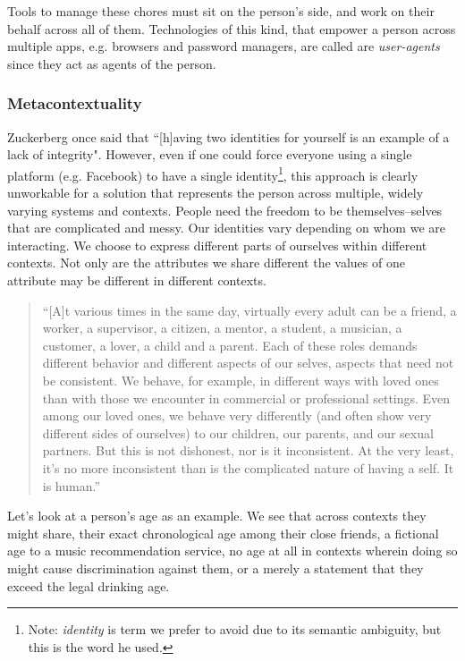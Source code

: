 \documentclass[11pt, oneside]{article}   	%
\begin{document}
Tools to manage these chores must sit on the person's side, and work on their behalf across all of them. Technologies of this kind, that empower a person across multiple apps, e.g. browsers and password managers, are called are \emph{user-agents} since they act as agents of the person. 

\subsubsection{Metacontextuality}

Zuckerberg once said that ``[h]aving two identities for yourself is an example of a lack of integrity"\cite{Kirkpatrick2011}. However, even if one could force everyone using a single platform (e.g. Facebook) to have a single identity\footnote{Note: \emph{identity} is term we prefer to avoid due to its semantic ambiguity, but this is the word he used.}, this approach is clearly unworkable for a solution that represents the person across multiple, widely varying systems and contexts. People need the freedom to be themselves--selves that are complicated and messy. Our identities vary depending on whom we are interacting. We choose to express different parts of ourselves within different contexts. Not only are the attributes we share different the values of one attribute may be different in different contexts. 

\begin{quote} 
	``[A]t various times in the same day, virtually every adult can be a friend, a worker, a supervisor, a citizen, a mentor, a student, a musician, a customer, a lover, a child and a parent. Each of these roles demands different behavior and different aspects of our selves, aspects that need not be consistent. We behave, for example, in different ways with loved ones than with those we encounter in commercial or professional settings. Even among our loved ones, we behave very differently (and often show very different sides of ourselves) to our children, our parents, and our sexual partners. But this is not dishonest, nor is it inconsistent. At the very least, it's no more inconsistent than is the complicated nature of having a self. It is human.''\cite[p122]{Richards2021}
\end{quote}

Let's look at a person's age as an example. We see that across contexts they might share, their exact chronological age among their close friends, a fictional age to a music recommendation service, no age at all in contexts wherein doing so might cause discrimination against them, or a merely a statement that they exceed the legal drinking age. 
\end{document}
